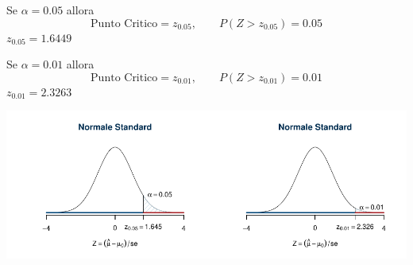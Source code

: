\documentclass[
  11pt,
]{book}
\theoremstyle{mytheoremstyle}
\theoremstyle{mydefstyle}
\begin{document}
Se \(\alpha=0.05\) allora
\[\text{Punto Critico}=z_{0.05},\qquad P(Z>z_{0.05})=0.05\]
\(z_{0.05}=1.6449\)

Se \(\alpha=0.01\) allora
\[\text{Punto Critico}=z_{0.01},\qquad P(Z>z_{0.01})=0.01\]
\(z_{0.01}=2.3263\)

\begin{center}\includegraphics{Appunti_di_Statistica_2025_files/figure-latex/15-test-mu-pi-15-1} \end{center}
\end{document}
